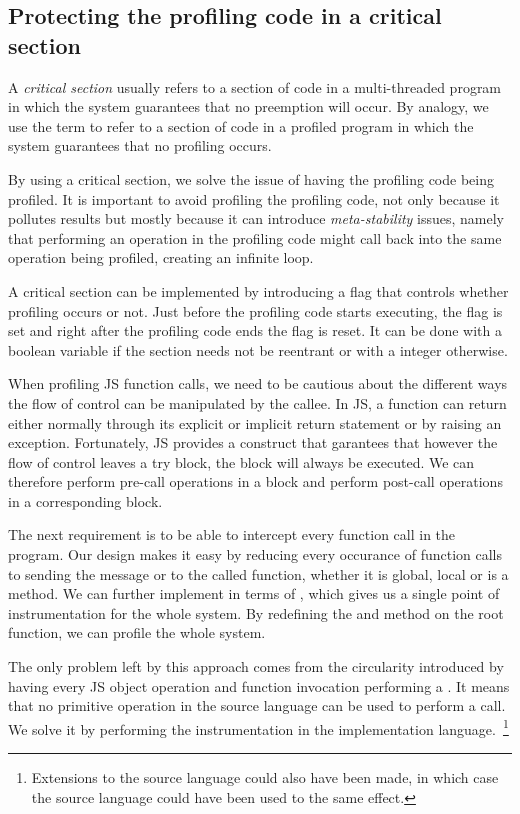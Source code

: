 \subsection{Protecting the profiling code in a critical section} 

A \textit{critical section} usually refers to a section of code in a
multi-threaded program in which the system guarantees that no preemption will
occur. By analogy, we use the term to refer to a section of code in a profiled
program in which the system guarantees that no profiling occurs.

By using a critical section, we solve the issue of having the profiling code
being profiled. It is important to avoid profiling the profiling code, not only
because it pollutes results but mostly because it can introduce
\textit{meta-stability} issues, namely that performing an operation in the
profiling code might call back into the same operation being profiled, creating
an infinite loop.

A critical section can be implemented by introducing a flag that controls
whether profiling occurs or not. Just before the profiling code starts
executing, the flag is set and right after the profiling code ends the flag is
reset. It can be done with a boolean variable if the section needs not be
reentrant or with a integer otherwise.

When profiling JS function calls, we need to be cautious about the different
ways the flow of control can be manipulated by the callee. In JS, a function
can return either normally through its explicit or implicit return statement or
by raising an exception. Fortunately, JS provides a  construct that
garantees that however the flow of control leaves a try block, the 
block will always be executed. We can therefore perform pre-call operations in
a  block and perform post-call operations in a corresponding
 block.

The next requirement is to be able to intercept every function call in the
program. Our design makes it easy by reducing every occurance of function calls
to sending the message  or  to the called function, whether
it is global, local or is a method. We can further implement  in terms
of , which gives us a single point of instrumentation for the whole
system. By redefining the  and  method on the root function,
we can profile the whole system.

The only problem left by this approach comes from the circularity introduced by
having every JS object operation and function invocation performing a
. It means that no primitive operation in the source language can be
used to perform a call. We solve it by performing the instrumentation in the
implementation language.~\footnote{Extensions to the source language could also
have been made, in which case the source language could have been used to the
same effect.}

